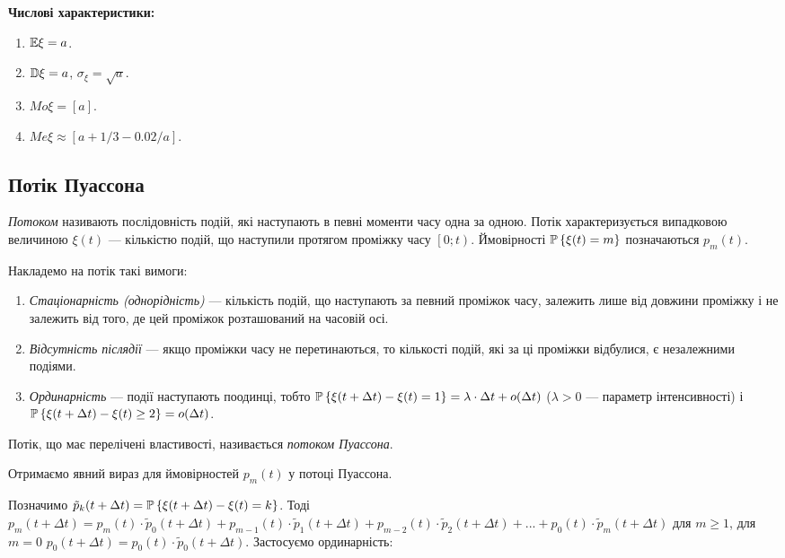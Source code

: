 \noindent\textbf{Числові характеристики:}
\begin{enumerate}
    \item $\E\xi = a$.
    \item $\D\xi = a$, $\sigma_\xi = \sqrt{a}$.
    \item ${Mo}\xi = \left[a\right]$.
    \item ${Me}\xi \approx \left[a + 1/3 - 0.02/a\right]$.
\end{enumerate}

\subsection{Потік Пуассона}
\emph{Потоком} називають послідовність подій, які наступають в певні моменти часу одна за одною.
Потік характеризується випадковою величиною $\xi(t)$ --- 
кількістю подій, що наступили протягом проміжку часу $\left[ 0; t\right)$.
Ймовірності $\P\left\{\xi(t) = m\right\}$ позначаються $p_m(t)$.

Накладемо на потік такі вимоги:
\begin{enumerate}
    \item \emph{Стаціонарність (однорідність)} --- кількість подій, що наступають
    за певний проміжок часу, залежить лише від довжини проміжку і не залежить
    від того, де цей проміжок розташований на часовій осі.
    \item \emph{Відсутність післядії} --- якщо проміжки часу не перетинаються, то кількості подій,
    які за ці проміжки відбулися, є незалежними подіями.
    \item \emph{Ординарність} --- події наступають поодинці, тобто
    $\P\left\{\xi(t+\Delta t) - \xi(t) = 1\right\} = \lambda\cdot\Delta t + o(\Delta t)$
    ($\lambda > 0$ --- параметр інтенсивності) і 
    $\P\left\{\xi(t+\Delta t) - \xi(t) \geq 2\right\} = o(\Delta t)$.
\end{enumerate}
\begin{definition}
    Потік, що має перелічені властивості, називається \emph{потоком Пуассона}.
\end{definition}
Отримаємо явний вираз для ймовірностей $p_m(t)$ у потоці Пуассона.

Позначимо $\tilde{p}_k(t+\Delta t) = \P\left\{\xi(t+\Delta t) - \xi(t) = k\right\}$.
Тоді $p_m(t+\Delta t) = p_m(t)\cdot \tilde{p}_0(t+\Delta t) + p_{m-1}(t)\cdot \tilde{p}_1(t+\Delta t) +
p_{m-2}(t)\cdot \tilde{p}_2(t+\Delta t) + ... + p_0(t)\cdot \tilde{p}_m(t+\Delta t)$ для $m \geq 1$,
для $m=0$ $p_0(t+\Delta t) = p_0(t)\cdot\tilde{p}_0(t+\Delta t)$. Застосуємо ординарність:

